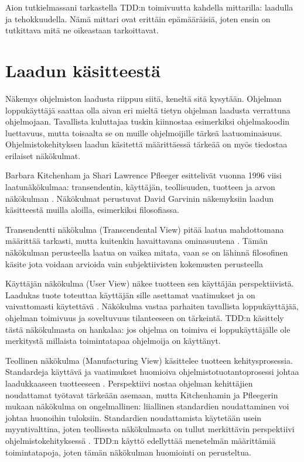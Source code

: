 \documentclass[finnish]{tktltiki2}
\theoremstyle{definition}
\theoremstyle{remark}
\begin{document}
Aion tutkielmassani tarkastella TDD:n toimivuutta kahdella mittarilla: laadulla ja tehokkuudella. Nämä mittari ovat erittäin epämääräisiä, joten ensin on tutkittava mitä ne oikeastaan tarkoittavat.


\section{Laadun käsitteestä}

Näkemys ohjelmiston laadusta riippuu siitä, keneltä sitä kysytään. Ohjelman loppukäyttäjä saattaa olla aivan eri mieltä tietyn ohjelman laadusta verrattuna ohjelmojaan. Tavallista kuluttajaa tuskin kiinnostaa esimerkiksi ohjelmakoodin luettavuus, mutta toisaalta se on muille ohjelmoijille tärkeä laatuominaisuus. Ohjelmistokehityksen laadun käsitettä määrittäessä tärkeää on myös tiedostaa erilaiset näkökulmat.

Barbara Kitchenham ja Shari Lawrence Pfleeger esittelivät vuonna 1996 viisi laatunäkökulmaa: transendentin, käyttäjän, teollisuuden, tuotteen ja arvon näkökulman \cite{Kitchenham96}. Näkökulmat perustuvat David Garvinin näkemyksiin laadun käsitteestä muilla aloilla, esimerkiksi filosofiassa.

Transendentti näkökulma (Transcendental View) pitää laatua mahdottomana määrittää tarkasti, mutta kuitenkin havaittavana ominasuutena \cite{Kitchenham96}. Tämän näkökulman perusteella laatua on vaikea mitata, vaan se on lähinnä filosofinen käsite jota voidaan arvioida vain subjektiivisten kokemusten perusteella

Käyttäjän näkökulma (User View) näkee tuotteen sen käyttäjän perspektiivistä. Laadukas tuote toteuttaa käyttäjän sille asettamat vaatimukset ja on vaivattomasti käytettävä \cite{Kitchenham96}. Näkökulma vastaa parhaiten tavallista loppukäyttäjää, ohjelman toimivuus ja soveltuvuus tilanteeseen on tärkeintä. TDD:n käsittely tästä näkökulmasta on hankalaa: jos ohjelma on toimiva ei loppukäyttäjälle ole merkitystä millaista toimintatapaa ohjelmoija on käyttänyt.

Teollinen näkökulma (Manufacturing View) käsittelee tuotteen kehitysprosessia. Standardeja käyttävä ja vaatimukset huomioiva ohjelmistotuotantoprosessi johtaa laadukkaaseen tuotteeseen \cite{Kitchenham96}. Perspektiivi nostaa ohjelman kehittäjien noudattamat työtavat tärkeään asemaan, mutta Kitchenhamin ja Pfleegerin mukaan näkökulma on ongelmallinen: liiallinen standardien noudattaminen voi johtaa huonoihin tuloksiin. Standardien noudattamista käytetään usein myyntivalttina, joten teollisesta näkökulmasta on tullut merkittävin perspektiivi ohjelmistokehityksessä \cite{Cote07}. TDD:n käyttö edellyttää menetelmän määrittämiä toimintatapoja, joten tämän näkökulman huomiointi on perusteltua. 
\end{document}
